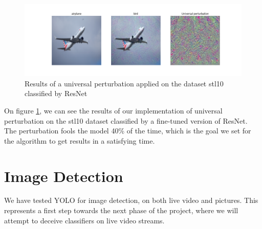 \documentclass{article}
\begin{document}
\begin{figure}[H]
    \centering
    \includegraphics[width=1\linewidth]{results/example_universal_stl10_resnet.png}
    \caption{Results of a universal perturbation applied on the dataset stl10 classified by ResNet}
    \label{fig:universal}
\end{figure}

On figure \ref{fig:universal}, we can see the results of our implementation of universal perturbation on the stl10 dataset classified by a fine-tuned version of ResNet. The perturbation fools the model 40\% of the time, which is the goal we set for the algorithm to get results in a satisfying time. 


\section{Image Detection}

We have tested YOLO for image detection, on both live video and pictures. 
This represents a first step towards the next phase of the project, where we will attempt to deceive classifiers on live video streams.
\end{document}

